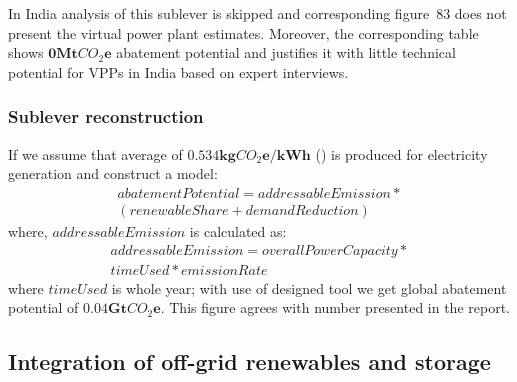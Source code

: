 \documentclass[11pt, twocolumn]{article}
\begin{document}
In India analysis of this sublever is skipped and corresponding figure~83 does not present the virtual power plant estimates. Moreover, the corresponding table shows $\mathbf{0} \mathbf{Mt}CO_2\mathbf{e}$ abatement potential and justifies it with little technical potential for VPPs in India based on expert interviews.


\subsubsection{Sublever reconstruction\label{sec:vpp:reconstruction}}
If we assume that average of $\mathbf{0.534 kg}CO_2\mathbf{e}/\mathbf{kWh}$ (\citep{iea2012co2}) is produced for electricity generation and construct a model:\\
\begin{gather*}
    abatementPotential = addressableEmission * \\ 
    ( renewableShare + demandReduction )
\end{gather*}
where, $addressableEmission$ is calculated as:\\
\begin{gather*}
  addressableEmission = overallPowerCapacity *\\
  timeUsed * emissionRate
\end{gather*}
where $timeUsed$ is whole year; with use of designed tool we get global abatement potential of $\mathbf{0.04} \mathbf{Gt}CO_2\mathbf{e}$. This figure agrees with number presented in the report.



\subsection{Integration of off-grid renewables and storage}
\end{document}

